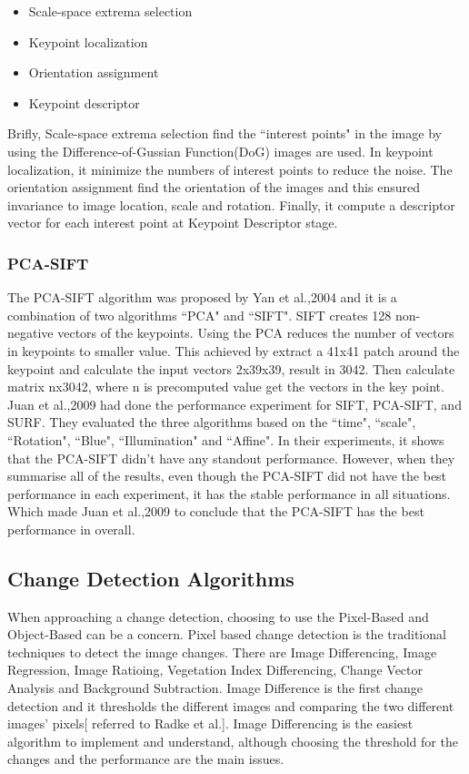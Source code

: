\documentclass[runningheads,a4paper]{llncs}
\begin{document}
\begin{itemize}
\item Scale-space extrema selection
\item Keypoint localization
\item Orientation assignment
\item Keypoint descriptor
\end{itemize}
Brifly, Scale-space extrema selection find the ``interest points" in the image by using the Difference-of-Gussian Function(DoG) images are used.  In keypoint localization, it minimize the numbers of interest points to reduce the noise. The orientation assignment find the orientation of the images and this ensured invariance to image location, scale and rotation. Finally, it compute a descriptor vector for each interest point at Keypoint Descriptor stage.

\subsubsection{PCA-SIFT}
The PCA-SIFT algorithm was proposed by Yan et al.,2004\cite{1315206} and it is a combination of two algorithms ``PCA" and ``SIFT". SIFT creates 128 non-negative vectors of the keypoints. Using the PCA reduces the number of vectors in keypoints to smaller value. This achieved by extract a 41x41 patch around the keypoint and calculate the input vectors 2x39x39, result in 3042. Then calculate matrix nx3042, where n is precomputed value get the vectors in the key point.
Juan et al.,2009\cite{juan2009comparison} had done the performance experiment for SIFT, PCA-SIFT, and SURF. They evaluated the three algorithms based on the ``time", ``scale", ``Rotation", ``Blue", ``Illumination" and ``Affine". In their experiments, it shows that the PCA-SIFT didn't have any standout performance. However, when they summarise all of the results, even though the PCA-SIFT did not have the best performance in each experiment, it has the stable performance in all situations. Which made Juan et al.,2009\cite{juan2009comparison} to conclude that the PCA-SIFT has the best performance in overall. %
\subsection{Change Detection Algorithms}



When approaching a change detection, choosing to use the Pixel-Based and Object-Based can be a concern.
Pixel based change detection is the traditional techniques to detect the image changes. There are Image Differencing, Image Regression, Image Ratioing, Vegetation Index Differencing, Change Vector Analysis and Background Subtraction. Image Difference is the first change detection and it thresholds the different images and comparing the two different images' pixels[ referred to Radke et al.\cite{radke2005image}]. Image Differencing is the easiest algorithm to implement and understand, although choosing the threshold for the changes and the performance are the main issues. 
\end{document}
